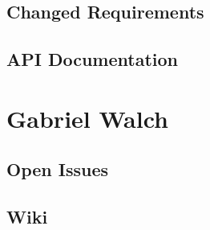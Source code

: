 \documentclass[11pt,a4paper,titlepage]{article}
\begin{document}
\subsection{Changed Requirements}

\subsection{API Documentation}


\section{Gabriel Walch}

\subsection{Open Issues}

\subsection{Wiki}
\end{document}
